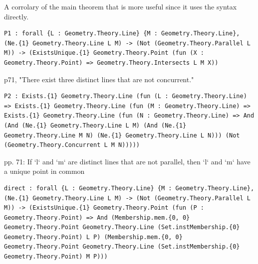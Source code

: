 \begin{theorem}
  \label{Geometry.Ch2.Prop.P1}
  \leanok
  A corrolary of the main theorem that is more useful since it uses the syntax directly. 
\begin{verbatim}P1 : forall {L : Geometry.Theory.Line} {M : Geometry.Theory.Line}, (Ne.{1} Geometry.Theory.Line L M) -> (Not (Geometry.Theory.Parallel L M)) -> (ExistsUnique.{1} Geometry.Theory.Point (fun (X : Geometry.Theory.Point) => Geometry.Theory.Intersects L M X))\end{verbatim}
\end{theorem}

\begin{theorem}
  \label{Geometry.Ch2.Prop.P2}
  \leanok
  p71, "There exist three distinct lines that are not concurrent." 
\begin{verbatim}P2 : Exists.{1} Geometry.Theory.Line (fun (L : Geometry.Theory.Line) => Exists.{1} Geometry.Theory.Line (fun (M : Geometry.Theory.Line) => Exists.{1} Geometry.Theory.Line (fun (N : Geometry.Theory.Line) => And (And (Ne.{1} Geometry.Theory.Line L M) (And (Ne.{1} Geometry.Theory.Line M N) (Ne.{1} Geometry.Theory.Line L N))) (Not (Geometry.Theory.Concurrent L M N)))))\end{verbatim}
\end{theorem}


\begin{theorem}
  \label{Geometry.Ch2.Prop.P1.direct}
  \leanok
  pp. 71: If `l` and `m` are distinct lines that are not parallel, then `l` and `m` have a unique point in common 
\begin{verbatim}direct : forall {L : Geometry.Theory.Line} {M : Geometry.Theory.Line}, (Ne.{1} Geometry.Theory.Line L M) -> (Not (Geometry.Theory.Parallel L M)) -> (ExistsUnique.{1} Geometry.Theory.Point (fun (P : Geometry.Theory.Point) => And (Membership.mem.{0, 0} Geometry.Theory.Point Geometry.Theory.Line (Set.instMembership.{0} Geometry.Theory.Point) L P) (Membership.mem.{0, 0} Geometry.Theory.Point Geometry.Theory.Line (Set.instMembership.{0} Geometry.Theory.Point) M P)))\end{verbatim}
\end{theorem}


